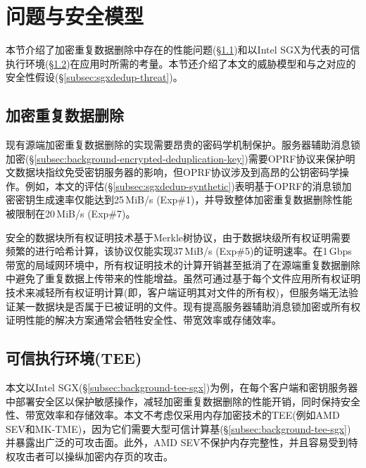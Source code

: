 \section{问题与安全模型}
\label{sec:sgxdedup-background}

本节介绍了加密重复数据删除中存在的性能问题(\S\ref{subsec:sgxdedup-problem})和以Intel SGX为代表的可信执行环境(\S\ref{subsec:sgxdedup-sgx})在应用时所需的考量。本节还介绍了本文的威胁模型和与之对应的安全性假设(\S\ref{subsec:sgxdedup-threat})。

\subsection{加密重复数据删除}
\label{subsec:sgxdedup-problem}

现有源端加密重复数据删除的实现需要昂贵的密码学机制保护。服务器辅助消息锁加密(\S\ref{subsec:background-encrypted-deduplication-key})需要OPRF协议来保护明文数据块指纹免受密钥服务器的影响，但OPRF协议涉及到高昂的公钥密码学操作。例如，本文的评估(\S\ref{subsec:sgxdedup-synthetic})表明基于OPRF的消息锁加密密钥生成速率仅能达到25\,MiB/s (Exp\#1)，并导致整体加密重复数据删除性能被限制在20\,MiB/s (Exp\#7)。

安全的数据块所有权证明技术基于Merkle树协议，由于数据块级所有权证明需要频繁的进行哈希计算，该协议仅能实现37\,MiB/s (Exp\#5)的证明速率。在1\,Gbps带宽的局域网环境中，所有权证明技术的计算开销甚至抵消了在源端重复数据删除中避免了重复数据上传带来的性能增益。虽然可通过基于每个文件应用所有权证明技术来减轻所有权证明计算(即，客户端证明其对文件的所有权)，但服务端无法验证某一数据块是否属于已被证明的文件。现有提高服务器辅助消息锁加密或所有权证明性能的解决方案通常会牺牲安全性、带宽效率或存储效率。


\subsection{可信执行环境(TEE)}
\label{subsec:sgxdedup-sgx}

本文以Intel SGX(\S\ref{subsec:background-tee-sgx})为例，在每个客户端和密钥服务器中部署安全区以保护敏感操作，减轻加密重复数据删除的性能开销，同时保持安全性、带宽效率和存储效率。本文不考虑仅采用内存加密技术的TEE(例如AMD SEV和MK-TME)，因为它们需要大型可信计算基(\S\ref{subsec:background-tee-sgx})并暴露出广泛的可攻击面。此外，AMD SEV不保护内存完整性，并且容易受到特权攻击者可以操纵加密内存页的攻击。


